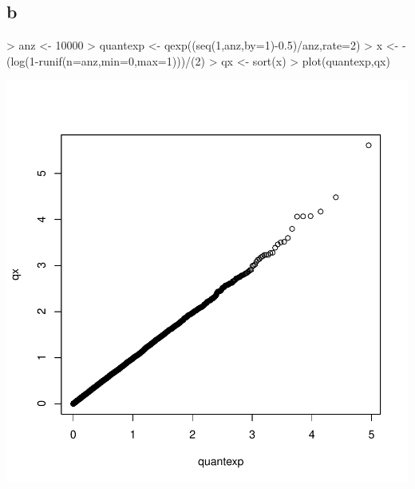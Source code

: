 \subsection{b}
\begin{Schunk}
\begin{Sinput}
> anz <- 10000
> quantexp <- qexp((seq(1,anz,by=1)-0.5)/anz,rate=2)
> x <- -(log(1-runif(n=anz,min=0,max=1)))/(2)
> qx <- sort(x)
> plot(quantexp,qx)
\end{Sinput}
\end{Schunk}
\includegraphics{sw08_1-002}
